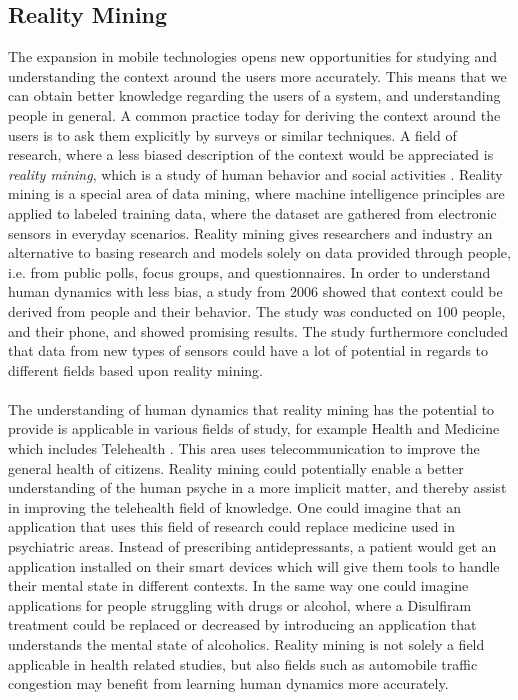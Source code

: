 \subsection{Reality Mining}
\label{sub:reality_mining}
The expansion in mobile technologies opens new opportunities for studying and understanding the context around the users more accurately. This means that we can obtain better knowledge regarding the users of a system, and understanding people in general. A common practice today for deriving the context around the users is to ask them explicitly by surveys or similar techniques. A field of research, where a less biased description of the context would be appreciated is \emph{reality mining}, which is a study of human behavior and social activities \parencite{madan2009_reality_mining_privacy}. Reality mining is a special area of data mining, where machine intelligence principles are applied to labeled training data, where the dataset are gathered from electronic sensors in everyday scenarios. Reality mining gives researchers and industry an alternative to basing research and models solely on data provided through people, i.e. from public polls, focus groups, and questionnaires. In order to understand human dynamics with less bias, a study from 2006 \parencite{eagle2006_reality_mining_definition} showed that context could be derived from people and their behavior. The study was conducted on 100 people, and their phone, and showed promising results. The study furthermore concluded that data from new types of sensors could have a lot of potential in regards to different fields based upon reality mining. 
\\\\
The understanding of human dynamics that reality mining has the potential to provide is applicable in various fields of study, for example Health and Medicine \parencite{pentland2009_reality_mining_health_medicine} which includes Telehealth \parencite{telehealth_aau}. This area uses telecommunication to improve the general health of citizens. Reality mining could potentially enable a better understanding of the human psyche in a more implicit matter, and thereby assist in improving the telehealth field of knowledge. One could imagine that an application that uses this field of research could replace medicine used in psychiatric areas. Instead of prescribing antidepressants, a patient would get an application installed on their smart devices which will give them tools to handle their mental state in different contexts. In the same way one could imagine applications for people struggling with drugs or alcohol, where a Disulfiram \parencite{nlm_disulfiram} treatment could be replaced or decreased by introducing an application that understands the mental state of alcoholics. Reality mining is not solely a field applicable in health related studies, but also fields such as automobile traffic congestion \parencite{pentland2009reality_mining_mobile_communication_gps} may benefit from learning human dynamics more accurately.
